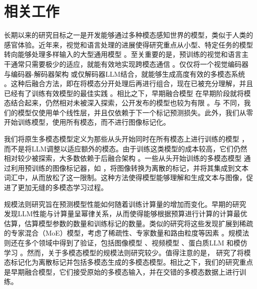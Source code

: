 \section{相关工作}

 长期以来的研究目标之一是开发能够通过多种模态感知世界的模型，类似于人类的感官体验。近年来，视觉和语言处理的进展使得研究重点从小型、特定任务的模型转向能够处理多样输入的大型通用模型 \citep{team2023gemini,hurst2024gpt4o}。至关重要的是，预训练的视觉和语言主干通常只需要极少的适应，就能有效地实现跨模态通信 \citep{tsimpoukelli2021multimodalfrozen,shukor2023epalm,vallaeys2024improveddepalm,merullo2023linearly,koh2023grounding}。仅仅将一个视觉编码器与编码器-解码器架构 \citep{shukor2023unival,wang2022ofa,lu2022unified,mizrahi20234m} 或仅解码器LLM结合，就能够生成高度有效的多模态系统 \citep{laurenccon2024mattersidefics2,alayrac2022flamingo,liu2024improvedllava,wang2024qwen2,xue2024xgenblip3,chen2024internvl,zhu2024minigpt,abdin2024phi3,dai2024nvlm,beyer2024paligemma,moon2024anymal}。这种后融合方法，即在将模态分开处理后再进行组合，现在已被充分理解，并且已经有了训练有效模型的最佳实践 \citep{laurenccon2024obelics,mckinzie2025mm1,zhang2024mm1_5,lin2024vila}。相比之下，早期融合模型 \citep{fuyu8b,team2024chameleon,diao2024unveiling} 在早期阶段就将模态结合起来，仍然相对未被深入探索，公开发布的模型也较为有限 \citep{fuyu8b,diao2024unveiling}。与 \citep{diao2024unveiling,team2024chameleon} 不同，我们的模型仅使用单个线性层，并且仅依赖于下一个标记预测损失。此外，我们从零开始训练模型，使用所有模态，而不进行图像标记化。

 我们将原生多模态模型定义为那些从头开始同时在所有模态上进行训练的模型 \citep{team2023gemini}，而不是将LLM调整以适应额外的模态。由于训练这类模型的成本较高，它们仍然相对较少被探索，大多数依赖于后融合架构 \citep{kosmoshuang2023language,yu2022coca}。一些从头开始训练的多模态模型 \citep{aghajanyan2022cm3,team2024chameleon,wang2024emu3} 通过利用预训练的图像标记器，如 \citep{vqgan,vqvae}，将图像转换为离散的标记，并将其集成到文本词汇中，从而放松了这一限制。这种方法使得模型能够理解和生成文本与图像，促进了更加无缝的多模态学习过程。

 规模法则研究旨在预测模型性能如何随着训练计算量的增加而变化。早期的研究 \citep{kaplan2020scaling,hoffmann2022training} 发现LLM性能与计算量呈幂律关系，从而使得能够根据预算进行计算的计算最优估算，估算模型参数的数量和训练标记的数量。类似的研究将这些发现扩展到稀疏的专家混合（MoE）模型，考虑了稀疏性、专家数量和路由粒度等因素 \citep{krajewski2024scalingmoe,clark2022unifiedscalingmoe,wangscalingmoe}。规模法则还在多个领域中得到了验证，包括图像模型 \citep{fini2024multimodalaimv2}、视频模型 \citep{rajasegaran2025empirical}、蛋白质LLM \citep{scalingprotein} 和模仿学习 \citep{pearce2024scaling}。然而，关于多模态模型的规模法则研究较少。值得注意的是，\citet{aghajanyan2023scalingmm} 研究了将模态标记化为离散标记并包括多模态生成的多模态模型。相比之下，我们的研究重点是早期融合模型，它们接受原始的多模态输入，并在交错的多模态数据上进行训练。

